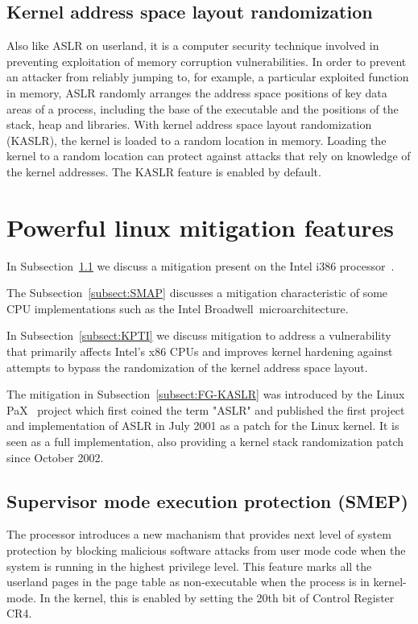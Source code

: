 \documentclass{masterthesis}
\newcommand{\refToSubSection}[1]{Subsection~\ref{subsect:#1}\xspace}
\begin{document}
\subsection{Kernel address space layout randomization}
\label{subsect:KASLR}
Also like ASLR on userland, it is a computer security technique involved in preventing exploitation of memory corruption vulnerabilities. In order to prevent an attacker from reliably jumping to, for example, a particular exploited function in memory, ASLR randomly arranges the address space positions of key data areas of a process, including the base of the executable and the positions of the stack, heap and libraries.
With kernel address space layout randomization (KASLR), the kernel is loaded to a random location in memory.
Loading the kernel to a random location can protect against attacks that rely on knowledge of the kernel addresses.
The KASLR feature is enabled by default.

\section{Powerful linux mitigation features}
\label{sect:powerful mitigation}
In \refToSubSection{SMEP} we discuss a mitigation present on the Intel i386 processor~\cite{inteli386}.

The \refToSubSection{SMAP} discusses a mitigation characteristic of some CPU implementations such as the Intel Broadwell~\cite{nalamalpu2015broadwell}microarchitecture.

In \refToSubSection{KPTI} we discuss mitigation to address a vulnerability that primarily affects Intel's x86 CPUs and improves kernel hardening against attempts to bypass the randomization of the kernel address space layout.

The mitigation in \refToSubSection{FG-KASLR} was introduced by the Linux PaX~\cite{nalamalpu2015broadwell} project which first coined the term "ASLR" and published the first project and implementation of ASLR in July 2001 as a patch for the Linux kernel. It is seen as a full implementation, also providing a kernel stack randomization patch since October 2002.
\subsection{Supervisor mode execution protection (SMEP)}
\label{subsect:SMEP}
The processor introduces a new machanism that provides next level of system protection by blocking malicious software attacks from user mode code when the system is running in the highest privilege level.
This feature marks all the userland pages in the page table as non-executable when the process is in kernel-mode. In the kernel, this is enabled by setting the 20th bit of Control Register CR4.
\end{document}
